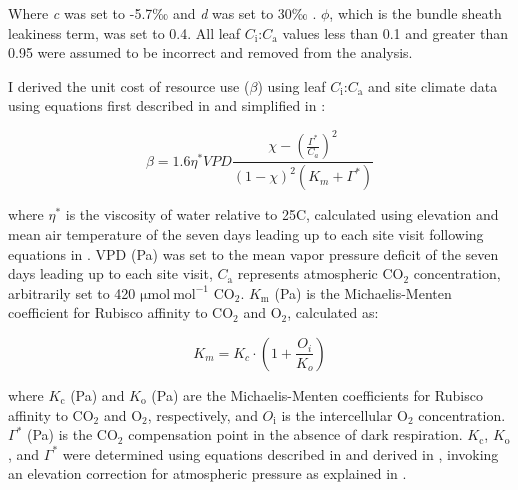 \noindent Where \textit{c} was set to -5.7‰ and \textit{d} was set to 30‰ . $\phi$, which is the bundle sheath leakiness term, was set to 0.4. All leaf $C_\mathrm{i}$:$C_\mathrm{a}$ values less than 0.1 and greater than 0.95 were assumed to be incorrect and removed from the analysis.
    
I derived the unit cost of resource use ($\beta$) using leaf $C_\mathrm{i}$:$C_\mathrm{a}$ and site climate data using equations first described in  and simplified in :

\begin{equation}
    \label{eq_4.5}
    \beta = 1.6\eta^{*} VPD \frac{\chi - (\frac{\Gamma^*}{C_{a}})^{2}}{(1 - \chi)^{2}(K_{m} + \Gamma^{*})}
\end{equation}
    
\noindent where $\eta^{*}$ is the viscosity of water relative to 25\textdegree{}C, calculated using elevation and mean air temperature of the seven days leading up to each site visit following equations in . VPD (Pa) was set to the mean vapor pressure deficit of the seven days leading up to each site visit, $C_\mathrm{a}$ represents atmospheric CO$_2$ concentration, arbitrarily set to 420 $\mathrm{\mu mol\ mol^{-1}}$ CO$_2$. $K_\mathrm{m}$ (Pa) is the Michaelis-Menten coefficient for Rubisco affinity to CO$_2$ and O$_2$, calculated as:
    
\begin{equation} \label{eq_4.6}
    K_{m} = K_{c} \cdot \left ( 1 + \frac{O_i}{K_o} \right )
\end{equation}

\noindent where $K_\mathrm{c}$ (Pa) and $K_\mathrm{o}$ (Pa) are the Michaelis-Menten coefficients for Rubisco affinity to CO$_2$ and O$_2$, respectively, and $O_\mathrm{i}$  is the intercellular O$_2$ concentration. $\Gamma^{*}$ (Pa) is the CO$_2$ compensation point in the absence of dark respiration. $K_\mathrm{c}$, $K_\mathrm{o}$, and $\Gamma^{*}$ were determined using equations described in  and derived in , invoking an elevation correction for atmospheric pressure as explained in .
\clearpage

